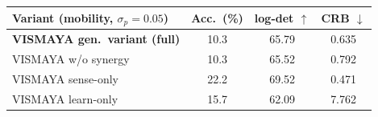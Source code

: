 \begin{tabular}{@{}l c c c@{}}
\toprule
Variant (mobility, $\sigma_p{=}0.05$) & Acc.\ (\%) & log-det $\uparrow$ & CRB $\downarrow$ \\
\midrule
\textbf{VISMAYA gen.\ variant (full)} & 10.3 & 65.79 & 0.635 \\
VISMAYA w/o synergy & 10.3 & 65.52 & 0.792 \\
VISMAYA sense-only & 22.2 & 69.52 & 0.471 \\
VISMAYA learn-only & 15.7 & 62.09 & 7.762 \\
\bottomrule
\end{tabular}